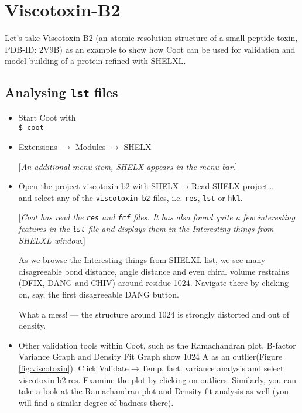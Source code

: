 \documentclass{article}
\begin{document}


\section{Viscotoxin-B2}
Let's take Viscotoxin-B2 (an atomic resolution structure of a small
peptide toxin, PDB-ID: 2V9B) as an example to show how Coot can be
used for validation and model building of a protein refined with
SHELXL.

\subsection{Analysing \texttt{lst} files}

\begin{itemize}
\item Start Coot with\\\texttt{\$ coot}


\item \textsf{Extensions $\rightarrow$ Modules $\rightarrow$ SHELX}

  [\textsl{An additional menu item, SHELX appears in the menu bar}.]


\item
  Open the project viscotoxin-b2 with \textsf{SHELX$\to$Read SHELX
    project\ldots}\\and select any of the \texttt{viscotoxin-b2}
  files, i.e. \texttt{res}, \texttt{lst} or \texttt{hkl}.

[\textsl{Coot has read the \texttt{res} and \texttt{fcf} files. It has
  also found quite a few interesting features in the \texttt{lst} file
  and displays them in the \textsf{Interesting things from SHELXL}
  window.}]

As we browse the Interesting things from SHELXL list, we see many
disagreeable bond distance, angle distance and even chiral volume
restrains (DFIX, DANG and CHIV) around residue 1024. Navigate there by
clicking on, say, the first disagreeable DANG button.

What a mess! --- the structure around 1024 is strongly distorted and
out of density.

\item Other validation tools within Coot, such as the Ramachandran
  plot, B-factor Variance Graph and Density Fit Graph show 1024 A as
  an outlier\linebreak[4](Figure \ref{fig:viscotoxin}). Click
  \textsf{Validate$\to$Temp. fact. variance analysis} and
  select \textsf{viscotoxin-b2.res}. Examine the plot by
  clicking on outliers. Similarly, you can take a look at the
  Ramachandran plot and Density fit analysis as well (you will find a
  similar degree of badness there).


\end{itemize}
\end{document}
